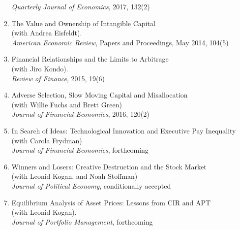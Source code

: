 \documentclass[12pt,letterpaper,serif,overlapped]{res}
\begin{document}
\begin{resume}
\begin{itemize}
\begin{enumerate}
\emph{Quarterly Journal of Economics}, 2017, 132(2)
\item The Value and Ownership of Intangible Capital\\ (with Andrea Eisfeldt). \\
\emph{American Economic Review}, Papers and Proceedings, May 2014, 104(5)
\item Financial Relationships and the Limits to Arbitrage\\ (with Jiro Kondo).\\
\emph{Review of Finance}, 2015, 19(6)
\item Adverse Selection, Slow Moving Capital and Misallocation\\ (with Willie Fuchs and Brett Green)\\
\emph{Journal of Financial Economics}, 2016, 120(2)
\item In Search of Ideas: Technological Innovation and Executive Pay Inequality\\ (with Carola Frydman)\\
\emph{Journal of Financial Economics}, forthcoming
\item Winners and Losers: Creative Destruction and the Stock Market\\ (with Leonid Kogan, and Noah Stoffman)\\\emph{Journal of Political Economy}, conditionally accepted
\item Equilibrium Analysis of Asset Prices: Lessons from CIR and APT\\(with Leonid Kogan). \\
\emph{Journal of Portfolio Management}, forthcoming\end{enumerate}
 

\end{itemize}
\end{resume}
\end{document}
